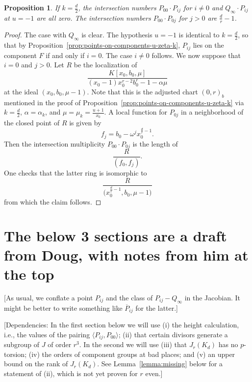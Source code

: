 \documentclass[reqno]{amsart}
\newtheorem{proposition}[thm]{Proposition}
\theoremstyle{definition}
\theoremstyle{remark}
\begin{document}
\begin{proposition}\label{prop:local-intersections-u-minus-1}
  If $k = \frac{d}{2}$, the intersection numbers $P_{00} \cdot P_{ij}$ for $i \neq 0$ and $Q_{\infty} \cdot P_{ij}$ at $u = -1$ are all zero. The intersection numbers $P_{00} \cdot P_{0j}$ for $j > 0$ are $\frac{d}{r} - 1$.
\end{proposition}

\begin{proof}
  The case with $Q_\infty$ is clear. The hypothesis $u = -1$ is identical to $k = \frac{d}{2}$, so that by Proposition~\ref{prop:points-on-components-u-zeta-k}, $P_{ij}$ lies on the component $F$ if and only if $i = 0$. The case $i \neq 0$ follows. We now suppose that $i = 0$ and $j > 0$. Let $R$ be the localization of
  \[
  \frac{K[x_0,b_0,\mu]}{(x_0 - 1)x_0^{r-2}b_0^r - 1 - \alpha \mu}
  \]
  at the ideal $(x_0, b_0, \mu - 1)$. Note that this is the adjusted chart $(0,r)_b$ mentioned in the proof of Proposition~\ref{prop:points-on-components-u-zeta-k} via $k = \frac{d}{2}$, $\alpha = \alpha_k$, and $\mu = \mu_k = \frac{u+1}{x_0}$. A local function for $P_{0j}$ in a neighborhood of the closed point of $R$ is given by
  \[
  f_j = b_0 - \omega^j x_0^{\frac{d}{r} - 1}.
  \]
  Then the intersection multiplicity $P_{00} \cdot P_{0j}$ is the length of 
  \[
  \frac{R}{(f_0, f_j)}.
  \]
  One checks that the latter ring is isomorphic to
  \[
  \frac{R}{\bigg(x_0^{\frac{d}{r} - 1}, b_0, \mu - 1\bigg)}
  \]
  from which the claim follows.
\end{proof}


\section*{The below 3 sections are a draft from Doug, with notes from him at the top}

[As usual, we conflate a point $P_{ij}$ and the class of
$P_{ij}-Q_\infty$ in the Jacobian.  It might be better to write
something like $\overline P_{ij}$ for the latter.]

[Dependencies: In the first section below we will use (i) the height
calculation, i.e., the values of the pairing $\langle
P_{ij},P_{00}\rangle$; (ii) that certain divisors generate a subgroup
of $J$ of order $r^3$.  In the second we will use (iii) that
$J_r(K_d)$ has no $p$-torsion; (iv) the orders of component groups at
bad places; and (v) an upper bound on the rank of $J_r(K_d)$.  See
Lemma~\ref{lemma:missing} below for a statement of (ii), which is not
yet proven for $r$ even.]
\end{document}
